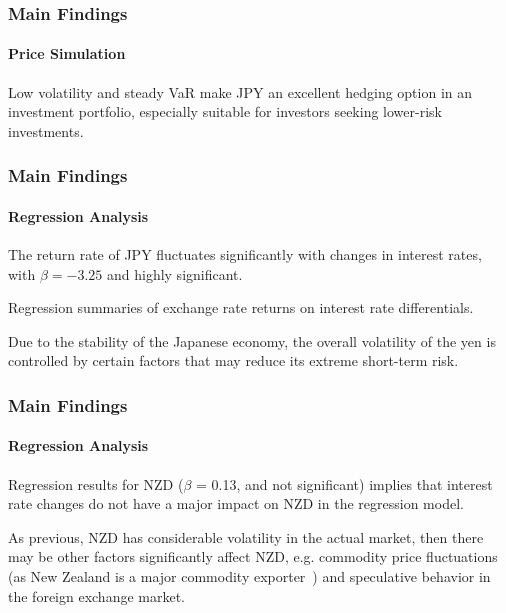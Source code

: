 \documentclass[10pt]{beamer}
\begin{document}
\begin{frame}
\frametitle{Main Findings}
\framesubtitle{Price Simulation}
Low volatility and steady VaR make JPY an excellent hedging option in an investment portfolio, especially suitable for investors seeking lower-risk investments.
\end{frame}
\begin{frame}
\frametitle{Main Findings}
\framesubtitle{Regression Analysis}
The return rate of JPY fluctuates significantly with changes in interest rates, with $\beta = -3.25$ and highly significant.
\begin{table}[h]
\centering
\caption{\footnotesize Regression summaries of exchange rate returns on interest rate differentials.} 
\label{tab:var_results}
\end{table}
Due to the stability of the Japanese economy, the overall volatility of the yen is controlled by certain factors that may reduce its extreme short-term risk.
\end{frame}
\begin{frame}
\frametitle{Main Findings}
\framesubtitle{Regression Analysis}
Regression results for NZD ($\beta$ = 0.13, and not significant) implies that interest rate changes do not have a major impact on NZD in the regression model. 

As previous, NZD has considerable volatility in the actual market, then there may be other factors significantly affect NZD, e.g. commodity price fluctuations (as New Zealand is a major commodity exporter~\cite{blundell1990exchange}) and speculative behavior in the foreign exchange market.
\end{frame}
\end{document}
